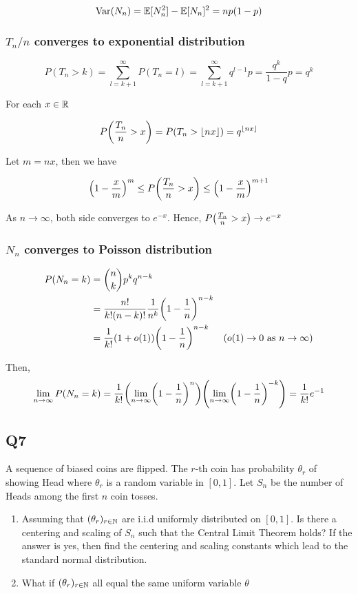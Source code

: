 \documentclass{article}
\begin{document}
$$
    \operatorname{Var}(N_n) = \mathbb{E}[N_n^2] - \mathbb{E}[N_n]^2 = np (1-p)
$$

\subsubsection{$T_n / n$ converges to exponential distribution}

$$
    P(T_n > k) = \sum_{l=k+1}^\infty P(T_n=l) = \sum_{l=k+1}^\infty q^{l-1} p = \frac{q^k}{1-q} p = q^k
$$

For each $x \in \mathbb{R}$

$$
    P\tuple*{\frac{T_n}{n} > x} = P(T_n > \lfloor nx \rfloor) = q^{\lfloor nx \rfloor} 
$$

Let $m = nx$, then we have

$$
    \tuple*{1 - \frac{x}{m}}^m \leq P\tuple*{\frac{T_n}{n} > x} \leq \tuple*{1 - \frac{x}{m}}^{m+1}
$$

As $n \to \infty$, both side converges to $e^{-x}$. Hence, $P\tuple*{\frac{T_n}{n} > x} \to e^{-x}$

\subsubsection{$N_n$ converges to Poisson distribution}

\begin{align*}
    P(N_n = k)
    &= {n \choose k} p^k q^{n-k} \\
    &= \frac{n!}{k! (n-k)!} \frac{1}{n^k} \tuple*{1 - \frac{1}{n}}^{n-k} \\
    &= \frac{1}{k!} (1 + o(1)) \tuple*{1 - \frac{1}{n}}^{n-k} &\text{($o(1) \to 0$ as $n \to \infty$)}\\
\end{align*}

Then,
$$
    \lim_{n \to \infty} P(N_n = k) = \frac{1}{k!} \tuple*{\lim_{n \to \infty} \tuple*{1 - \frac{1}{n}}^n} \tuple*{\lim_{n \to \infty} \tuple*{1 - \frac{1}{n}}^{-k}} = \frac{1}{k!} e^{-1}
$$


\subsection{Q7}

A sequence of biased coins are flipped. The $r$-th coin has probability $\theta_r$ of showing Head where $\theta_r$ is a random variable in $[0, 1]$. Let $S_n$ be the number of Heads among the first $n$ coin tosses.

\begin{enumerate}
    \item Assuming that $(\theta_r)_{r \in \mathbb{N}}$ are i.i.d uniformly distributed on $[0, 1]$. Is there a centering and scaling of $S_n$ such that the Central Limit Theorem holds? If the answer is yes, then find the centering and scaling constants which lead to the standard normal distribution.

    \item What if $(\theta_r)_{r \in \mathbb{N}}$ all equal the same uniform variable $\theta$
\end{enumerate}
\end{document}
